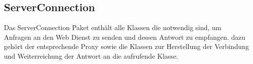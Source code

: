 \subsection{ServerConnection} \label{module:serverconnection}
Das ServerConnection Paket enthält alle Klassen die notwendig sind, um Anfragen an den Web Dienst zu senden und dessen Antwort zu empfangen. dazu gehört der entsprechende Proxy sowie die Klassen zur Herstellung der Verbindung und Weiterreichung der Antwort an die aufrufende Klasse.